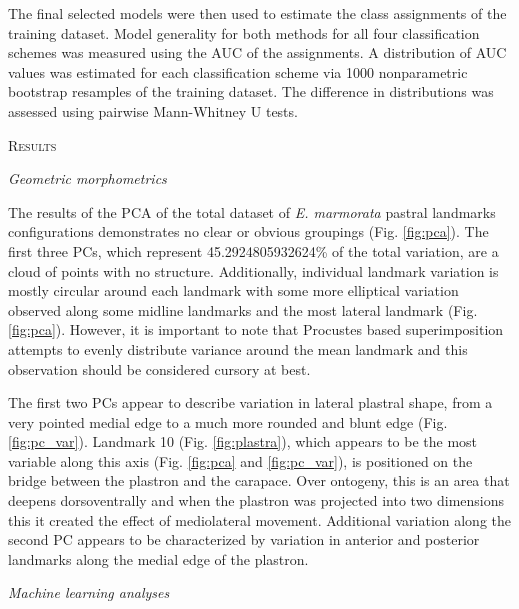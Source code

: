 \documentclass[12pt,letterpaper]{article}\usepackage{graphicx, color}
\renewcommand{\section}[1]{%
\bigskip
\begin{center}
\begin{Large}
\normalfont\scshape #1
\medskip
\end{Large}
\end{center}}
\renewcommand{\subsection}[1]{%
\bigskip
\begin{center}
\begin{large}
\normalfont\itshape #1
\end{large}
\end{center}}
\begin{document}
The final selected models were then used to estimate the class assignments of the training dataset. Model generality for both methods for all four classification schemes was measured using the AUC of the assignments. A distribution of AUC values was estimated for each classification scheme via 1000 nonparametric bootstrap resamples of the training dataset. The difference in distributions was assessed using pairwise Mann-Whitney U tests.

\section{Results}
\subsection{Geometric morphometrics}
The results of the PCA of the total dataset of \textit{E. marmorata} pastral landmarks configurations demonstrates no clear or obvious groupings (Fig. \ref{fig:pca}). The first three PCs, which represent 45.2924805932624\% of the total variation, are a cloud of points with no structure. Additionally, individual landmark variation is mostly circular around each landmark with some more elliptical variation observed along some midline landmarks and the most lateral landmark (Fig. \ref{fig:pca}). However, it is important to note that Procustes based superimposition attempts to evenly distribute variance around the mean landmark \citep{Zelditch2004} and this observation should be considered cursory at best.

The first two PCs appear to describe variation in lateral plastral shape, from a very pointed medial edge to a much more rounded and blunt edge (Fig. \ref{fig:pc_var}). Landmark 10 (Fig. \ref{fig:plastra}), which appears to be the most variable along this axis (Fig. \ref{fig:pca} and \ref{fig:pc_var}), is positioned on the bridge between the plastron and the carapace. Over ontogeny, this is an area that deepens dorsoventrally and when the plastron was projected into two dimensions this it created the effect of mediolateral movement.
Additional variation along the second PC appears to be characterized by variation in anterior and posterior landmarks along the medial edge of the plastron.



\subsection{Machine learning analyses}
\end{document}
